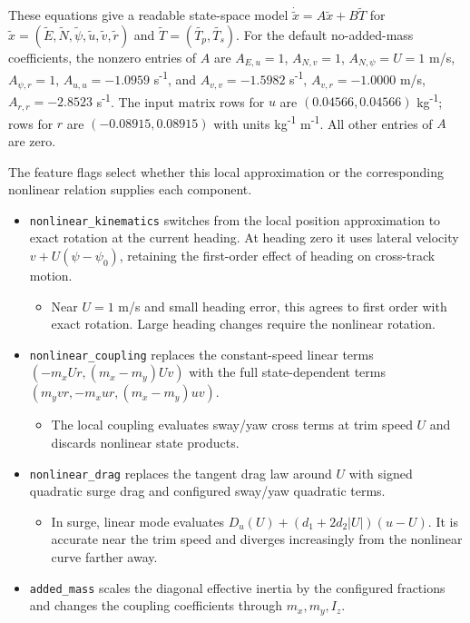 \documentclass[10pt,letterpaper]{article}
\begin{document}
These equations give a readable state-space model \(\dot{\widetilde{x}} = A\widetilde{x} + B\widetilde{T}\) for \(\widetilde{x} = \left( \widetilde{E},\widetilde{N},\widetilde{\psi},\widetilde{u},\widetilde{v},\widetilde{r} \right)\) and \(\widetilde{T} = \left( \widetilde{T_{p}},\widetilde{T_{s}} \right)\). For the default no-added-mass coefficients, the nonzero entries of \(A\) are \(A_{E,u} = 1\), \(A_{N,v} = 1\), \(A_{N,\psi} = U = 1\) m/s, \(A_{\psi,r} = 1\), \(A_{u,u} = - 1.0959\) s\textsuperscript{-1}, and \(A_{v,v} = - 1.5982\) s\textsuperscript{-1}, \(A_{v,r} = - 1.0000\) m/s, \(A_{r,r} = - 2.8523\) s\textsuperscript{-1}. The input matrix rows for \(u\) are \((0.04566,0.04566)\) kg\textsuperscript{-1}; rows for \(r\) are \(( - 0.08915,0.08915)\) with units kg\textsuperscript{-1} m\textsuperscript{-1}. All other entries of \(A\) are zero.

The feature flags select whether this local approximation or the corresponding nonlinear relation supplies each component.

\begin{itemize}
\item
  \texttt{nonlinear\_kinematics} switches from the local position approximation to exact rotation at the current heading. At heading zero it uses lateral velocity \(v + U\left( \psi - \psi_{0} \right)\), retaining the first-order effect of heading on cross-track motion.

  \begin{itemize}
  \item
    Near \(U = 1\) m/s and small heading error, this agrees to first order with exact rotation. Large heading changes require the nonlinear rotation.
  \end{itemize}
\item
  \texttt{nonlinear\_coupling} replaces the constant-speed linear terms \(\left( - m_{x}Ur,\left( m_{x} - m_{y} \right)Uv \right)\) with the full state-dependent terms \(\left( m_{y}vr, - m_{x}ur,\left( m_{x} - m_{y} \right)uv \right)\).

  \begin{itemize}
  \item
    The local coupling evaluates sway/yaw cross terms at trim speed \(U\) and discards nonlinear state products.
  \end{itemize}
\item
  \texttt{nonlinear\_drag} replaces the tangent drag law around \(U\) with signed quadratic surge drag and configured sway/yaw quadratic terms.

  \begin{itemize}
  \item
    In surge, linear mode evaluates \(D_{u}(U) + \left( d_{1} + 2d_{2}|U| \right)(u - U)\). It is accurate near the trim speed and diverges increasingly from the nonlinear curve farther away.
  \end{itemize}
\item
  \texttt{added\_mass} scales the diagonal effective inertia by the configured fractions and changes the coupling coefficients through \(m_{x},m_{y},I_{z}\).
\end{itemize}
\end{document}
